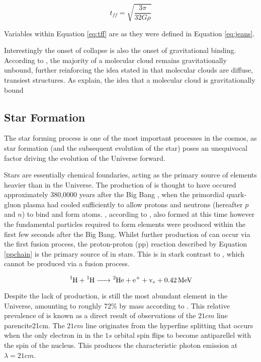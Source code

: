 \documentclass{report}
\begin{document}
\begin{equation}\label{eq:tff}
  t_{ff} = \sqrt{\frac{3\pi}{32G\rho}}
\end{equation}

Variables within Equation \ref{eq:tff} are as they were defined in Equation \ref{eq:jeans}.

Interestingly the onset of collapse is also the onset of gravitational binding. According to \textcite{bound}, the majority of a molecular cloud remains gravitationally unbound, further reinforcing the idea stated in \textcite{evo-mol} that molecular clouds are diffuse, transiest structures. As \textcite{bound} explain, the idea that a molecular cloud is gravitationally bound

\subsection{Star Formation}
The star forming process is one of the most important processes in the cosmos, as star formation (and the subsequent evolution of the star) poses an unequivocal factor driving the evolution of the Universe forward.

Stars are essentially chemical foundaries, acting as the primary source of elements heavier than  in the Universe. The production of  is thought to have occured approximately 380,0000 years after the Big Bang \parencite{peebles}, when the primordial quark-gluon plasma had cooled sufficiently to allow protons and neutrons (hereafter $p$ and $n$) to bind and form atoms. , according to \textcite{bbc}, also formed at this time however the fundamental particles required to form elements were produced within the first few seconds after the Big Bang. Whilst further production of  can occur via the first fusion process, the proton-proton (pp) reaction described by Equation \ref{ppchain} \parencite{synthesis} is the primary source of  in stars. This is in stark contrast to , which cannot be produced via a fusion process.

\begin{equation} \label{ppchain}
  \ce{^{1}{H} + ^{1}{H} -> ^{2}{He} + e^{+} + v_{e} + 0.42 MeV}
\end{equation}

Despite the lack of  production,  is still the most abundant element in the Universe, amounting to roughly 72\% by mass according to \textcite{abundance}. This relative prevalence of  is known as a direct result of observations of the $21cm$ line parencite{21cm}. The $21cm$ line originates from the hyperfine splitting that occurs when the only electron in  in the $1s$ orbital spin flips to become antiparellel with the spin of the nucleus. This produces the characteristic photon emission at $\lambda=21cm$.
\end{document}
